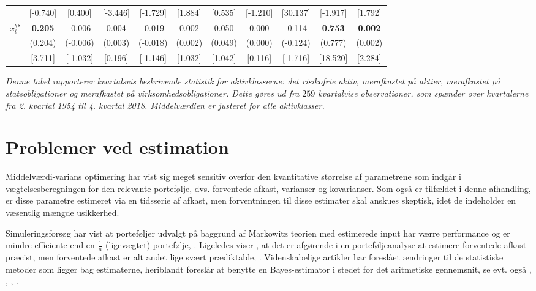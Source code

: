 \documentclass[
  a4paper,
  oneside]{memoir}
\begin{document}
\begin{landscape}
\begin{table}[H]
\begin{threeparttable}
\begin{tabular}[t]{ccccccccccc}
 & [-0.740] & [0.400] & [-3.446] & [-1.729] & [1.884] & [0.535] & [-1.210] & [30.137] & [-1.917] & [1.792]\\
 
\rowcolor{gray!6}  $x_t^{\text{ys}}$ & \textbf{  0.205} & -0.006 & 0.004 & -0.019 & 0.002 & 0.050 & 0.000 & -0.114 & \textbf{ 0.753} & \textbf{ 0.002}\\
 
 & (0.204) & (-0.006) & (0.003) & (-0.018) & (0.002) & (0.049) & (0.000) & (-0.124) & (0.777) & (0.002)\\
 
\rowcolor{gray!6}   & [3.711] & [-1.032] & [0.196] & [-1.146] & [1.032] & [1.042] & [0.116] & [-1.716] & [18.520] & [2.284]\\
\bottomrule
\end{tabular}
\begin{tablenotes}
\item \textit{Denne tabel rapporterer kvartalsvis beskrivende statistik for aktivklasserne: det risikofrie aktiv, merafkastet på aktier, merafkastet på statsobligationer og merafkastet på virksomhedsobligationer. Dette gøres ud fra $259$ kvartalvise observationer, som spænder over kvartalerne fra 2. kvartal 1954 til 4. kvartal 2018. Middelværdien er justeret for alle aktivklasser.}
\end{tablenotes}
\end{threeparttable}
\end{table}
\end{landscape}

\hypertarget{problemer-ved-estimation}{%
\chapter{Problemer ved estimation}\label{problemer-ved-estimation}}

Middelværdi-varians optimering har vist sig meget sensitiv overfor den kvantitative størrelse af parametrene som indgår i vægtelsesberegningen for den relevante portefølje, dvs. forventede afkast, varianser og kovarianser. Som også er tilfældet i denne afhandling, er disse parametre estimeret via en tidsserie af afkast, men forventningen til disse estimater skal anskues skeptisk, idet de indeholder en væsentlig mængde usikkerhed.

Simuleringsforsøg har vist at porteføljer udvalgt på baggrund af Markowitz teorien med estimerede input har værre performance og er mindre efficiente end en \(\tfrac{1}{n}\) (ligevægtet) portefølje, \citep{Frankfurter1971}. Ligeledes viser \citep{Chopra1993}, at det er afgørende i en porteføljeanalyse at estimere forventede afkast præcist, men forventede afkast er alt andet lige svært prædiktable, \citep{Merton1980}. Videnskabelige artikler har foreslået ændringer til de statistiske metoder som ligger bag estimaterne, heriblandt foreslår \citep{Jorion1986} at benytte en Bayes-estimator i stedet for det aritmetiske gennemsnit, se evt. også \citep{MacKinlay2000}, \citep{Garlappi2007}, \citep{Kan2007}, \citep{Tu2011}.
\end{document}
